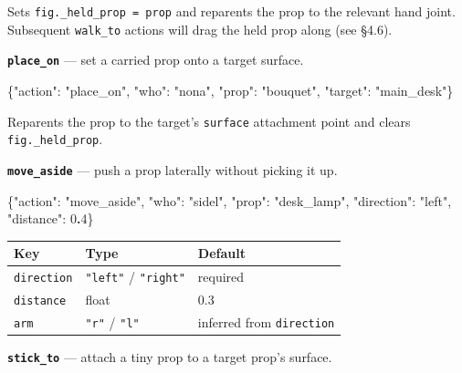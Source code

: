 \documentclass[
  11pt,
]{book}
\newenvironment{Shaded}{}{}
\newcommand{\DataTypeTok}[1]{\textcolor[rgb]{0.56,0.13,0.00}{#1}}
\newcommand{\DecValTok}[1]{\textcolor[rgb]{0.25,0.63,0.44}{#1}}
\newcommand{\ErrorTok}[1]{\textcolor[rgb]{1.00,0.00,0.00}{\textbf{#1}}}
\newcommand{\FunctionTok}[1]{\textcolor[rgb]{0.02,0.16,0.49}{#1}}
\newcommand{\StringTok}[1]{\textcolor[rgb]{0.25,0.44,0.63}{#1}}
\begin{document}
Sets \texttt{fig.\_held\_prop\ =\ prop} and reparents the prop to the
relevant hand joint. Subsequent \texttt{walk\_to} actions will drag the
held prop along (see §4.6).

\textbf{\texttt{place\_on}} --- set a carried prop onto a target
surface.

\begin{Shaded}
\begin{Highlighting}[]
\FunctionTok{\{}\DataTypeTok{"action"}\FunctionTok{:} \StringTok{"place\_on"}\FunctionTok{,} \DataTypeTok{"who"}\FunctionTok{:} \StringTok{"nona"}\FunctionTok{,}
 \DataTypeTok{"prop"}\FunctionTok{:} \StringTok{"bouquet"}\FunctionTok{,} \DataTypeTok{"target"}\FunctionTok{:} \StringTok{"main\_desk"}\FunctionTok{\}}
\end{Highlighting}
\end{Shaded}

Reparents the prop to the target's \texttt{surface} attachment point and
clears \texttt{fig.\_held\_prop}.

\textbf{\texttt{move\_aside}} --- push a prop laterally without picking
it up.

\begin{Shaded}
\begin{Highlighting}[]
\FunctionTok{\{}\DataTypeTok{"action"}\FunctionTok{:} \StringTok{"move\_aside"}\FunctionTok{,} \DataTypeTok{"who"}\FunctionTok{:} \StringTok{"sidel"}\FunctionTok{,}
 \DataTypeTok{"prop"}\FunctionTok{:} \StringTok{"desk\_lamp"}\FunctionTok{,} \DataTypeTok{"direction"}\FunctionTok{:} \StringTok{"left"}\FunctionTok{,} \DataTypeTok{"distance"}\FunctionTok{:} \DecValTok{0}\ErrorTok{.}\DecValTok{4}\FunctionTok{\}}
\end{Highlighting}
\end{Shaded}

\begin{longtable}[]{@{}lll@{}}
\toprule\noalign{}
Key & Type & Default \\
\midrule\noalign{}
\endhead
\bottomrule\noalign{}
\endlastfoot
\texttt{direction} & \texttt{"left"} / \texttt{"right"} & required \\
\texttt{distance} & float & 0.3 \\
\texttt{arm} & \texttt{"r"} / \texttt{"l"} & inferred from
\texttt{direction} \\
\end{longtable}

\textbf{\texttt{stick\_to}} --- attach a tiny prop to a target prop's
surface.
\end{document}
